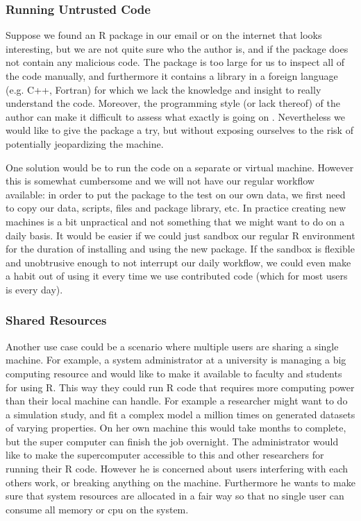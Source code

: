 \documentclass[article]{jss}
\newcommand{\R}{\textsf{R}\xspace}
\newcommand{\Cpp}{\textsf{C++}\xspace}
\newcommand{\Fortran}{\textsf{Fortran}\xspace}
\begin{document}
\subsubsection{Running Untrusted Code}

Suppose we found an \R package in our email or on the internet that
looks interesting, but we are not quite sure who the author is, and if the
package does not contain any malicious code. The package is too large for us to
inspect all of the code manually, and furthermore it contains a library in a
foreign language (e.g. \Cpp, \Fortran) for which we lack
the knowledge and insight to really understand the code. Moreover, the
programming style (or lack thereof) of the author can make it difficult to
assess what exactly is going on \citep{ioccc}. Nevertheless we would like to
give the package a try, but without exposing ourselves to the risk of potentially
jeopardizing the machine.

One solution would be to run the code on a separate or virtual machine. However
this is somewhat cumbersome and we will not have our regular workflow available:
in order to put the package to the test on our own data, we first need to
copy our data, scripts, files and package library, etc. In practice creating new
machines is a bit unpractical and not something that we might want to do on a
daily basis. It would be easier if we could just sandbox our regular \R
environment for the duration of installing and using the new package. If the
sandbox is flexible and unobtrusive enough to not interrupt our daily workflow,
we could even make a habit out of using it every time we use contributed code
(which for most users is every day).

\subsubsection{Shared Resources}

Another use case could be a scenario where multiple users are sharing a single
machine. For example, a system administrator at a university is managing a big
computing resource and would like to make it available to faculty and students
for using \R. This way they could run \R code that requires
more computing power than their local machine can handle. For example a
researcher might want to do a simulation study, and fit a complex model a
million times on generated datasets of varying properties. On her own machine
this would take months to complete, but the super computer can finish the job
overnight. The administrator would like to make the supercomputer accessible to
this and other researchers for running their \R code. However he is
concerned about users interfering with each others work, or breaking anything
on the machine. Furthermore he wants to make sure that system resources are
allocated in a fair way so that no single user can consume all memory or cpu on
the system.
\end{document}

